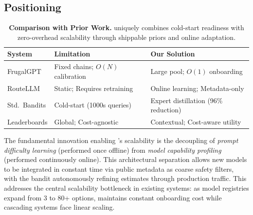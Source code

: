 \subsection{Positioning}

\begin{table}[t]
\centering
\footnotesize
\caption{\textbf{Comparison with Prior Work.} \ours{} uniquely combines cold-start readiness with zero-overhead scalability through shippable priors and online adaptation.}
\label{tab:related_comparison}
\begin{tabular}{p{2.0cm}p{2.6cm}p{2.4cm}}
\toprule
\textbf{System} & \textbf{Limitation} & \textbf{Our Solution} \\
\midrule
FrugalGPT & Fixed chains; $O(N)$ calibration & Large pool; $O(1)$ onboarding \\
RouteLLM & Static; Requires retraining & Online learning; Metadata-only \\
Std.\ Bandits & Cold-start (1000s queries) & Expert distillation (96\% reduction) \\
Leaderboards & Global; Cost-agnostic & Contextual; Cost-aware utility \\
\bottomrule
\end{tabular}
\end{table}

The fundamental innovation enabling \ours{}'s scalability is the decoupling of \emph{prompt difficulty learning} (performed once offline) from \emph{model capability profiling} (performed continuously online). This architectural separation allows new models to be integrated in constant time via public metadata as coarse safety filters, with the bandit autonomously refining estimates through production traffic. This addresses the central scalability bottleneck in existing systems: as model registries expand from 3 to 80+ options, \ours{} maintains constant onboarding cost while cascading systems face linear scaling.
